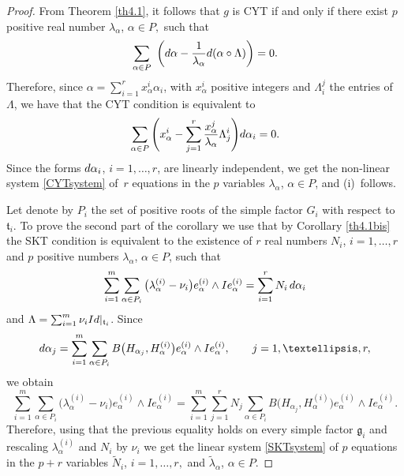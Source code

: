 \documentclass[10pt,a4paper]{article}
\numberwithin{equation}{section}
\theoremstyle{definition}
\begin{document}
\begin{proof}
From Theorem \ref{th4.1}, it follows that $g$ is CYT if and only if there exist $p$ positive real number $\lambda_{\alpha}$, $\alpha \in P,$ such that
\[
\sum_{\alpha \in P}  \bigg ({\rm d}\alpha - \frac{1}{\lambda_{\alpha} } {\rm d}( \alpha \circ \Lambda ) \bigg) =0.
\]
Therefore, since $\alpha =\sum_{i = 1}^r x_\alpha^i \alpha_i$, with $x_\alpha^i$ positive integers and $\Lambda_i^j$ the entries of $\Lambda$,
 we have that the CYT condition is equivalent to
\[
\sum_{\alpha \in P} \Bigg( x_\alpha^i - \sum_{j=1}^r \frac{x_\alpha^j}{\lambda_{\alpha}} \Lambda^i_j \Bigg) {\rm d}\alpha_i = 0.
\]
Since the forms ${\rm d} \alpha_i$, $i= 1, \dots, r$, are linearly independent, we get the non-linear system \eqref{CYTsystem} of~$r$ equations in the $p$ variables $\lambda_{\alpha}$, $\alpha \in P$, and (i)~follows.

Let denote by $P_i$ the set of positive roots of the simple factor $G_i$ with respect to $\mathfrak t_i$.
To prove the second part of the corollary we use that by Corollary \ref{th4.1bis} the SKT condition is equivalent to the existence of $r$ real numbers $N_i$, $i = 1, \dots, r$ and $p$ positive numbers $\lambda_{\alpha}$, $\alpha \in P$, such that
\[
\sum_{i = 1}^m \sum_{\alpha \in P_i} \big(\lambda_{\alpha}^{(i)} - \nu_i\big) e_{\alpha}^{(i)} \wedge I e_{\alpha}^{(i)} = \sum_{i = 1}^r N_i \, {\rm d}\alpha_i
\]
and $\Lambda = \sum_{i =1}^m \nu_i {\rm Id} |_{\mathfrak t_i}$.
Since
\[
{\rm d}\alpha_j= \sum_{i = 1}^m \sum_{\alpha \in P_i} B\big(H_{\alpha_j}, H_{\alpha}^{(i)}\big) e_{\alpha} ^{(i)} \wedge I e_{\alpha}^{(i)}, \qquad j =1, \dots, r,
\]
we obtain
\[
\sum_{i =1}^m \sum_{\alpha \in P_i} \big(\lambda_{\alpha}^{(i)} - \nu_i\big) e_{\alpha}^{(i)} \wedge I e_{\alpha} ^{(i)}= \sum_{i =1}^m \sum_{j = 1}^r N_j \sum_{\alpha \in P_i} B\big(H_{\alpha_j}, H_{\alpha}^{(i)}\big) e_{\alpha}^{(i)} \wedge I e_{\alpha}^{(i)}.
\]
Therefore, using that the previous equality holds on every simple factor $\mathfrak g_i$ and rescaling $\lambda_{\alpha}^{(i)}$ and $N_i$ by $\nu_i$ we get the linear system \eqref{SKTsystem} of $p$ equations in the $p + r$ variables $\tilde N_i$, $i = 1, \dots, r,$ and $ \tilde \lambda_{\alpha}$, $\alpha \in P.$


\end{proof}
\end{document}
